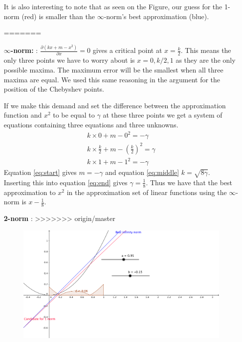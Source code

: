 \begin{solution}
\begin{enumerate}
It is also interesting to note that as seen on the Figure, our guess for the 1-norm (red) is smaller than the $\infty$-norm's best approximation (blue).

=======
  \item [{\bf $\infty$-norm: }]:
    $\frac{\partial (kx + m - x^2)}{\partial x} = 0$ gives a critical
    point at $x = \frac{k}{2}$. This means the only three points we
    have to worry about is $x = 0, k/2, 1$ as they are the only
    possible maxima. The maximum error will be the smallest when all
    three maxima are equal. We used this same reasoning in the
    argument for the position of the Chebyshev points.

    If we make this demand and set the difference between the
    approximation function and $x^2$ to be equal to $\gamma$ at these
    three points we get a system of equations containing three
    equations and three unknowns.
    \begin{align}
      k \times 0  + m  - 0^2  = -\gamma \label{eq:start}\\
      k \times \frac{k}{2}  + m - \left(\frac{k}{2}\right)^2  = \gamma
      \label{eq:middle}\\
      k \times 1  + m  - 1^2   = -\gamma \label{eq:end}
    \end{align}
    Equation \ref{eq:start} gives $m = - \gamma$ and equation
    \ref{eq:middle} $k = \sqrt{8\gamma}$. Inserting this into equation
    \ref{eq:end} gives $\gamma = \frac{1}{8}$. Thus we have that the
    best approximation to $x^2$ in the approximation set of linear
    functions using the $\infty$-norm is $x - \frac{1}{8}$.
    
  \item [{\bf 2-norm}]:
>>>>>>> origin/master
    \begin{figure}[!ht]
      \centering
      \includegraphics[scale = 0.2]{task7.png}
      \label{fig:task_7}
    \end{figure}

\end{enumerate}
\end{solution}

 	

